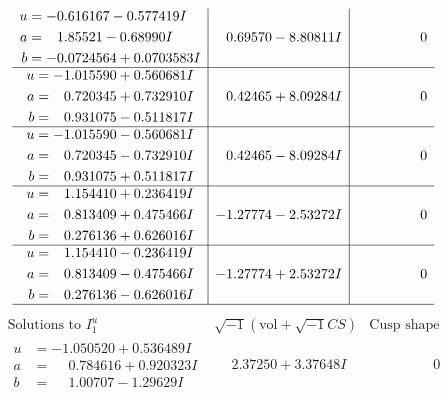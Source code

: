 \documentclass[1p]{elsarticle_modified}
\theoremstyle{definition}
\newcommand{\I}{\sqrt{-1}}
\begin{document}
$$\begin{array}{c|c|c}
\begin{aligned}
u &= -0.616167 - 0.577419 I \\
a &= \phantom{-}1.85521 - 0.68990 I \\
b &= -0.0724564 + 0.0703583 I\end{aligned}
 & \phantom{-}0.69570 - 8.80811 I & \phantom{-0.000000 } 0 \\ \hline\begin{aligned}
u &= -1.015590 + 0.560681 I \\
a &= \phantom{-}0.720345 + 0.732910 I \\
b &= \phantom{-}0.931075 - 0.511817 I\end{aligned}
 & \phantom{-}0.42465 + 8.09284 I & \phantom{-0.000000 } 0 \\ \hline\begin{aligned}
u &= -1.015590 - 0.560681 I \\
a &= \phantom{-}0.720345 - 0.732910 I \\
b &= \phantom{-}0.931075 + 0.511817 I\end{aligned}
 & \phantom{-}0.42465 - 8.09284 I & \phantom{-0.000000 } 0 \\ \hline\begin{aligned}
u &= \phantom{-}1.154410 + 0.236419 I \\
a &= \phantom{-}0.813409 + 0.475466 I \\
b &= \phantom{-}0.276136 + 0.626016 I\end{aligned}
 & -1.27774 - 2.53272 I & \phantom{-0.000000 } 0 \\ \hline\begin{aligned}
u &= \phantom{-}1.154410 - 0.236419 I \\
a &= \phantom{-}0.813409 - 0.475466 I \\
b &= \phantom{-}0.276136 - 0.626016 I\end{aligned}
 & -1.27774 + 2.53272 I & \phantom{-0.000000 } 0\\
 \hline 
 \end{array}$$\newpage$$\begin{array}{c|c|c}  
\text{Solutions to }I^u_{1}& \I (\text{vol} + \sqrt{-1}CS) & \text{Cusp shape}\\
 \hline 
\begin{aligned}
u &= -1.050520 + 0.536489 I \\
a &= \phantom{-}0.784616 + 0.920323 I \\
b &= \phantom{-}1.00707 - 1.29629 I\end{aligned}
 & \phantom{-}2.37250 + 3.37648 I & \phantom{-0.000000 } 0 \\ \hline\begin{aligned}

\end{aligned}
\end{array}$$
\end{document}
